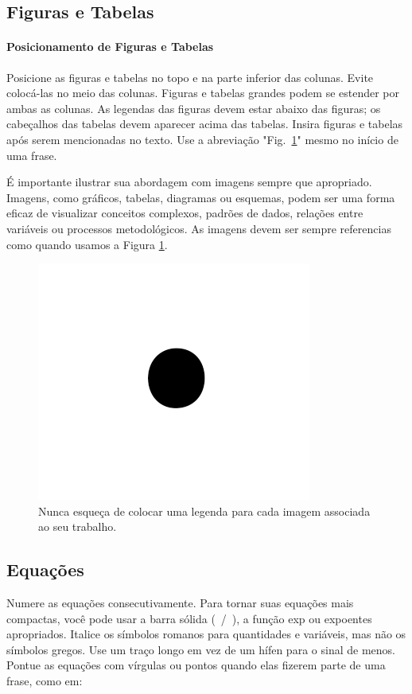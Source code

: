 \subsection{Figuras e Tabelas}
\paragraph{Posicionamento de Figuras e Tabelas} Posicione as figuras e tabelas no topo e na parte inferior das colunas. Evite colocá-las no meio das colunas. Figuras e tabelas grandes podem se estender por ambas as colunas. As legendas das figuras devem estar abaixo das figuras; os cabeçalhos das tabelas devem aparecer acima das tabelas. Insira figuras e tabelas após serem mencionadas no texto. Use a abreviação "Fig.~\ref{fig:figbase}" mesmo no início de uma frase.

É importante ilustrar sua abordagem com imagens sempre que apropriado. Imagens, como gráficos, tabelas, diagramas ou esquemas, podem ser uma forma eficaz de visualizar conceitos complexos, padrões de dados, relações entre variáveis ou processos metodológicos. As imagens devem ser sempre referencias como quando usamos a Figura \ref{fig:figbase}.

\begin{figure}[htbp]
    \centering
    \includegraphics{images/fig1.png}
    \caption{Nunca esqueça de colocar uma legenda para cada imagem associada ao seu trabalho.}
    \label{fig:figbase}
\end{figure}

\subsection{Equações}
Numere as equações consecutivamente. Para tornar suas equações mais compactas, você pode usar a barra sólida (~/~), a função exp ou expoentes apropriados. Italice os símbolos romanos para quantidades e variáveis, mas não os símbolos gregos. Use um traço longo em vez de um hífen para o sinal de menos. Pontue as equações com vírgulas ou pontos quando elas fizerem parte de uma frase, como em:


